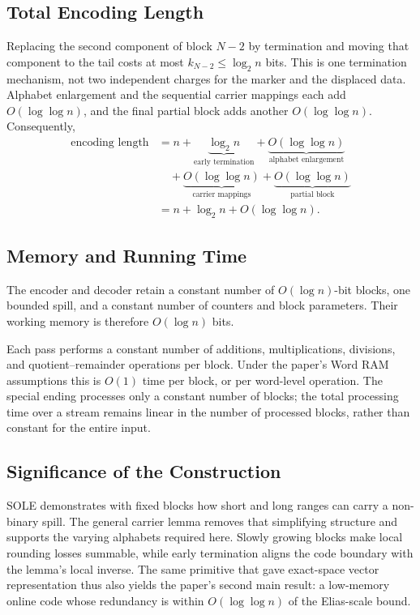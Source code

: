\subsection{Total Encoding Length}

Replacing the second component of block \(N-2\) by termination and moving
that component to the tail costs at most
\(k_{N-2}\leq\log_2n\) bits. This is one termination mechanism, not two
independent charges for the marker and the displaced data. Alphabet
enlargement and the sequential carrier mappings each add
\(O(\log\log n)\), and the final partial block adds another
\(O(\log\log n)\). Consequently,
\[
\begin{aligned}
    \text{encoding length}
    &=n+\underbrace{\log_2n}_{\text{early termination}}
      +\underbrace{O(\log\log n)}_{\text{alphabet enlargement}}\\
    &\quad+\underbrace{O(\log\log n)}_{\text{carrier mappings}}
      +\underbrace{O(\log\log n)}_{\text{partial block}}\\
    &=n+\log_2n+O(\log\log n).
\end{aligned}
\]

\subsection{Memory and Running Time}

The encoder and decoder retain a constant number of \(O(\log n)\)-bit
blocks, one bounded spill, and a constant number of counters and block
parameters. Their working memory is therefore \(O(\log n)\) bits.

Each pass performs a constant number of additions, multiplications,
divisions, and quotient--remainder operations per block. Under the paper's
Word RAM assumptions this is \(O(1)\) time per block, or per word-level
operation. The special ending processes only a constant number of blocks;
the total processing time over a stream remains linear in the number of
processed blocks, rather than constant for the entire input.

\subsection{Significance of the Construction}

SOLE demonstrates with fixed blocks how short and long ranges can carry a
non-binary spill. The general carrier lemma removes that simplifying
structure and supports the varying alphabets required here. Slowly growing
blocks make local rounding losses summable, while early termination aligns
the code boundary with the lemma's local inverse. The same primitive that
gave exact-space vector representation thus also yields the paper's second
main result: a low-memory online code whose redundancy is within
\(O(\log\log n)\) of the Elias-scale bound.
